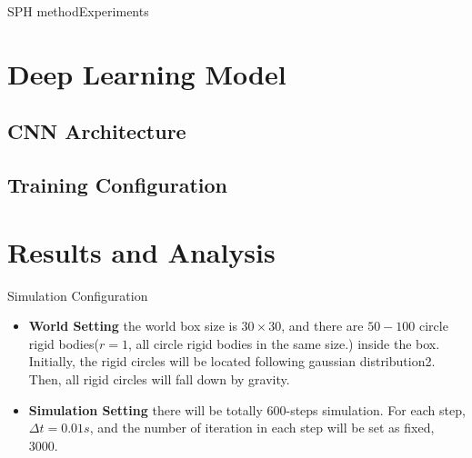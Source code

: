\documentclass{beamer}
\begin{document}
\begin{frame}{SPH method}{Experiments}
\end{frame}

\section{Deep Learning Model}
\subsection{CNN Architecture}
\subsection{Training Configuration}

\section{Results and Analysis}

\begin{frame}{Simulation Configuration}
\begin{itemize}
\item {
\textbf{World Setting}
\pause
the world box size is $30 \times 30$, and there are $50-100$ circle rigid bodies($r = 1$, all circle rigid bodies in the same size.) inside the box. Initially, the rigid circles will be located following gaussian distribution2. Then, all rigid circles will fall down by gravity.
\pause
}
\item {
\textbf{Simulation Setting}
\pause
there will be totally 600-steps simulation. For each step, $\Delta t = 0.01s$, and the number of iteration in each step will be set as fixed, 3000.
}

\end{itemize}
\end{frame}
\end{document}
